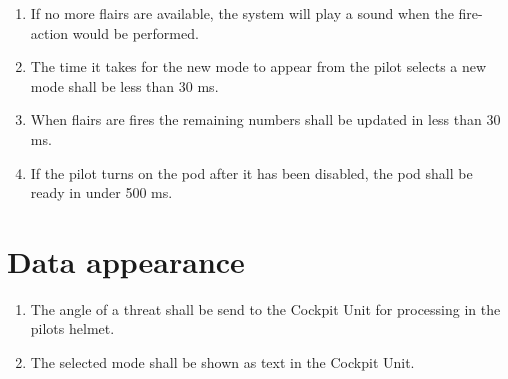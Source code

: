 \documentclass[Main]{subfiles}
\begin{document}
\begin{enumerate}[label=\bfseries DDD-2.\arabic*:]

\item If no more flairs are available, the system will play a sound when the fire-action would be performed.

\item The time it takes for the new mode to appear from the pilot selects a new mode shall be less than 30 ms.

\item When flairs are fires the remaining numbers shall be updated in less than 30 ms.

\item If the pilot turns on the pod after it has been disabled, the pod shall be ready in under 500 ms.

\end{enumerate}

\section{Data appearance}

\begin{enumerate}[label=\bfseries DDD-3.\arabic*:]

\item The angle of a threat shall be send to the Cockpit Unit for processing in the pilots helmet.

\item The selected mode shall be shown as text in the Cockpit Unit.

\end{enumerate}

%
%
%
\end{document}
